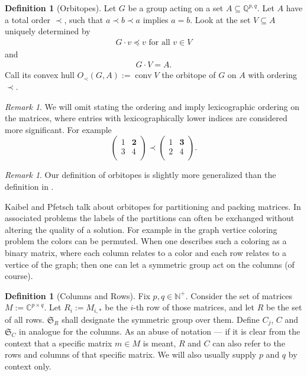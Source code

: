 \documentclass[a4paper]{amsart}
\theoremstyle{lemma}
\theoremstyle{definition}
\newtheorem{defn}[theorem]{Definition}
\theoremstyle{remark}
\newtheorem{remark}[theorem]{Remark}
\DeclareMathOperator{\conv}{conv}
\newcommand{\lex}{\ensuremath{\prec}} %
\newcommand{\lr}[1]{\ensuremath{\left( #1 \right)}}
\newcommand{\naturals}{\ensuremath{\mathbb{N}}}
\newcommand{\rationals}{\ensuremath{\mathbb{Q}}}
\newcommand{\Sym}{\ensuremath{\mathfrak{S}}}
\begin{document}
 \begin{defn}[Orbitopes]
   Let \(G\) be a group acting on a set \(A \subseteq \rationals^{p,q}\).  Let \(A\) have a total order \(\lex\), such that \(a\lex b \lex a\) implies \(a = b\).
   Look at the set \(V \subseteq A\) uniquely determined by
   \begin{align}
     \label{biggest}
       G \cdot v  \preceq v  \text{ for all } v \in V
     \end{align}
   and
   \begin{align}
     \label{complete}
     G \cdot V =  A \text{.}
   \end{align}
   Call its convex hull \(O_{\lex} \lr{G, A} := \conv{}  V\) the orbitope of
   \(G\) on \(A\) with ordering \(\lex\).  
 \end{defn}
\begin{remark}
  We will omit stating the ordering and imply lexicographic ordering
  on the matrices, where entries with lexicographically lower indices
  are considered more significant.  For example
  \[\lr{\begin{matrix}
      1 & \mathbf{2} \\
      3 & 4 \\
      \end{matrix}
    }
    \lex
    \lr{\begin{matrix}
      1 & \mathbf{3} \\
      2 & 4 \\
      \end{matrix}
    }\text{.}
  \]
\end{remark}
\begin{remark}
  Our definition of orbitopes is slightly more generalized than the definition in \cite{orbi}.
\end{remark}

Kaibel and Pfetsch talk about orbitopes for partitioning and packing
matrices.  In associated problems the labels of the partitions can
often be exchanged without altering the quality of a solution.  For
example in the graph vertice coloring problem the colors can be
permuted.  When one describes such a coloring as a binary matrix,
where each column relates to a color and each row relates to a vertice
of the graph; then one can let a symmetric group act on the columns
(of course).

\begin{defn}[Columns and Rows]
  Fix \(p, q \in \naturals^+\).  Consider the set of matrices \(M :=
  \mathbb{C}^{p \times q}\).  Let \(R_i := M_{i, *}\) be the \(i\)-th
  row of those matrices, and let \(R\) be the set of all rows.
  \(\Sym_R\) shall designate the symmetric group over them.  Define
  \(C_j\), \(C\) and \(\Sym_C\) in analogue for the columns.  As an abuse of
  notation --- if it is clear from the context that a specific matrix
  \(m \in M\) is meant, \(R\) and \(C\) can also refer to the rows
  and columns of that specific matrix.  We will also usually supply \(p\)
  and \(q\) by context only.
\end{defn}
\end{document}
